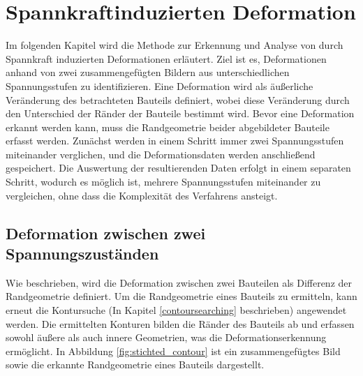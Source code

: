 
\chapter{Spannkraftinduzierten Deformation}

Im folgenden Kapitel wird die Methode zur Erkennung und Analyse von durch 
Spannkraft induzierten Deformationen erläutert. Ziel ist es, 
Deformationen anhand von zwei zusammengefügten Bildern aus unterschiedlichen 
Spannungsstufen zu identifizieren. Eine Deformation wird als äußerliche 
Veränderung des betrachteten Bauteils definiert, wobei diese Veränderung 
durch den Unterschied der Ränder der Bauteile bestimmt wird.
Bevor eine Deformation erkannt werden kann, muss die Randgeometrie beider 
abgebildeter Bauteile erfasst werden. 
Zunächst werden in einem Schritt immer zwei Spannungsstufen miteinander verglichen,
und die Deformationsdaten werden anschließend gespeichert. 
Die Auswertung der resultierenden Daten erfolgt in einem separaten Schritt, 
wodurch es möglich ist, mehrere Spannungsstufen miteinander zu vergleichen,
ohne dass die Komplexität des Verfahrens ansteigt.

\section{Deformation zwischen zwei Spannungszuständen}

Wie beschrieben, wird die Deformation zwischen zwei Bauteilen als Differenz 
der Randgeometrie definiert. Um die Randgeometrie eines Bauteils zu ermitteln, 
kann erneut die Kontursuche (In Kapitel \ref{contoursearching} beschrieben)
angewendet werden. 
Die ermittelten Konturen bilden die Ränder des Bauteils ab und 
erfassen sowohl äußere als auch innere Geometrien, was 
die Deformationserkennung ermöglicht. In Abbildung \ref{fig:stichted_contour} 
ist ein zusammengefügtes Bild sowie die erkannte Randgeometrie eines 
Bauteils dargestellt.

